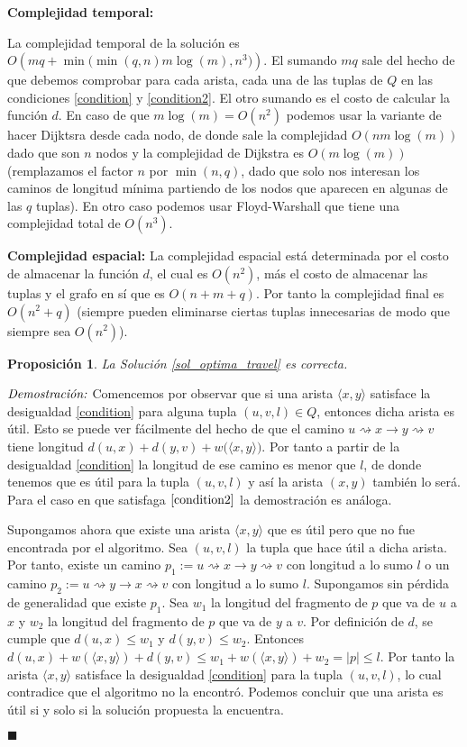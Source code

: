 \documentclass[10pt]{amsart}
\newtheorem{prop}[theorem]{Proposici\'on}
\theoremstyle{definition}
\numberwithin{equation}{section}
\newcommand{\lqqd}{{\small $\blacksquare$}}
\newcommand{\Proof}[2]{{\vspace{1em} $\emph{Demostración:}$ \textbf{#1} #2 \lqqd \vspace{1em}}}
\newcommand{\edge}[1]{\langle #1\rangle}
\begin{document}
\textbf{Complejidad temporal:}

 La complejidad temporal de la soluci\'on es $O\left(mq + \min\big(\min(q,n) m\log(m), n^3\big) \right)$. El sumando $mq$ sale del hecho de que debemos comprobar para cada arista, cada una de las tuplas de $Q$ en las condiciones \eqref{condition} y \eqref{condition2}. El otro sumando es el costo de calcular la funci\'on $d$. En caso de que $m \log(m) = O(n^2)$ podemos usar la variante de hacer Dijktsra desde cada nodo, de donde sale la complejidad $O(nm\log(m))$ dado que son $n$ nodos y la complejidad de Dijkstra es $O(m\log(m))$ (remplazamos el factor $n$ por $\min(n, q)$, dado que solo nos interesan los caminos de longitud m\'inima partiendo de los nodos que aparecen en algunas de las $q$ tuplas). En otro caso podemos usar Floyd-Warshall que tiene una complejidad total de $O(n^3)$.


\textbf{Complejidad espacial:}
	La complejidad espacial est\'a determinada por el costo de almacenar la funci\'on $d$, el cual es $O(n^2)$, m\'as el costo de almacenar las tuplas y el grafo en s\'i que es $O(n + m + q)$. Por tanto la complejidad final es $O(n^2 + q)$ (siempre pueden eliminarse ciertas tuplas innecesarias de modo que siempre sea $O(n^2)$).

\begin{prop}
	La Soluci\'on \ref{sol_optima_travel} es correcta.
\end{prop}
	\Proof{}{
		Comencemos por observar que si una arista $\edge{x,y}$ satisface la desigualdad \eqref{condition} para alguna tupla $(u,v,l) \in Q$, entonces dicha arista es \'util. Esto se puede ver f\'acilmente del hecho de que el camino $u\rightsquigarrow x \rightarrow y\rightsquigarrow v$ tiene longitud $d(u,x) + d(y,v) + w\big( \edge{x,y} \big)$. Por tanto a partir de la desigualdad \eqref{condition} la longitud de ese camino es menor que $l$, de donde tenemos que es \'util para la tupla $(u,v,l)$ y as\'i la arista $(x,y)$ tambi\'en lo ser\'a. Para el caso en que satisfaga $\eqref{condition2}$ la demostraci\'on es an\'aloga.
	
	Supongamos ahora que existe una arista $\edge{x, y}$ que es \'util pero que no fue encontrada por el algoritmo. Sea $(u, v, l)$ la tupla que hace \'util a dicha arista. Por tanto, existe un camino $p_1 := u \rightsquigarrow x \rightarrow y \rightsquigarrow v$ con longitud a lo sumo $l$ o un camino $p_2 := u \rightsquigarrow y \rightarrow x \rightsquigarrow v$ con longitud a lo sumo $l$. Supongamos sin p\'erdida de generalidad que existe $p_1$. Sea $w_1$ la longitud del fragmento de $p$ que va de $u$ a $x$ y $w_2$ la longitud del fragmento de $p$ que va de $y$ a $v$. Por definici\'on de $d$, se cumple que $d(u,x) \le w_1$ y $d(y, v) \le w_2$. Entonces $d(u,x) + w(\edge{x, y}) + d(y , v) \le w_1 + w(\edge{x,y}) + w_2 = |p| \le l$. Por tanto la arista $\edge{x, y}$ satisface la desigualdad \eqref{condition} para la tupla $(u,v,l)$, lo cual contradice que el algoritmo no la encontr\'o. Podemos concluir que una arista es \'util si y solo si la soluci\'on propuesta la encuentra.
		
	}
\end{document}
